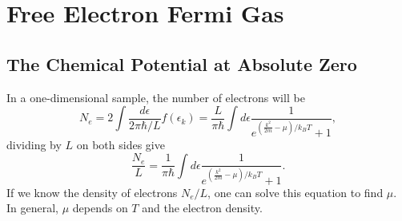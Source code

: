 \documentclass[11pt]{amsart}
\begin{document}

\setcounter{section}{2}

\section{Free Electron Fermi Gas}
\subsection{The Chemical Potential at Absolute Zero}
In a one-dimensional sample, the number of electrons will be
\begin{equation}
N_e = 2\int \frac{d \epsilon}{2\pi\hbar /L}f(\epsilon_k)
 = \frac{L}{\pi\hbar} \int d\epsilon \frac{1}{e^{(\frac{k^2}{2m} -\mu)/{k_B T}} + 1},
\end{equation}
dividing by $L$ on both sides give
\begin{equation}
\frac{N_e}{L} = \frac{1}{\pi\hbar} \int d\epsilon \frac{1}{e^{(\frac{k^2}{2m} -\mu)/{k_B T}} + 1}.
\end{equation}
If we know the density of electrons $N_e/L$, one can solve this equation to find $\mu$. In general, $\mu$ depends on $T$ and the electron density.
\end{document}
